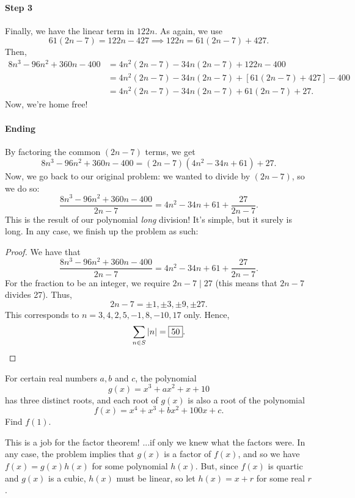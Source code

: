 \documentclass[../jarvis.tex]{subfiles}
\begin{document}
\paragraph{Step 3}Finally, we have the linear term in $122n$.
As again, we use $$61(2n-7)=122n-427 \implies 122n=61(2n-7)+427.$$ Then, 
\begin{align*}
    8n^3-96n^2+360n-400 &= 4n^2(2n-7)-34n(2n-7)+122n-400 \\
    &= 4n^2(2n-7)-34n(2n-7)+\left[61(2n-7)+427\right]-400 \\
    &= 4n^2(2n-7)-34n(2n-7)+61(2n-7)+27.
\end{align*}
Now, we're home free!
\paragraph{Ending}
By factoring the common $(2n-7)$ terms, we get
$$8n^3-96n^2+360n-400=(2n-7)(4n^2-34n+61)+27.$$ Now, we go back to our original problem: we wanted to divide by $(2n-7)$, so we do so:
$$\frac{8n^3-96n^2+360n-400}{2n-7}=4n^2-34n+61+\frac{27}{2n-7}.$$
This is the result of our polynomial \textit{long} division! It's simple, but it surely is long. In any case, we finish up the problem as such:

\begin{proof}
    We have that $$\frac{8n^3-96n^2+360n-400}{2n-7}=4n^2-34n+61+\frac{27}{2n-7}.$$
    For the fraction to be an integer, we require $2n-7\mid 27$ (this means that $2n-7$ divides 27). Thus,
    $$2n-7=\pm 1,\pm 3, \pm 9,\pm 27.$$
    This corresponds to $n=3,4,2,5,-1,8,-10,17$ only. Hence,
    $$\sum_{n\in S}\left\lvert n \right\rvert=\boxed{50}.$$
\end{proof}

\begin{example}[2017 AMC12A P23]
    For certain real numbers $a,b$ and $c$, the polynomial
    $$g(x)=x^3+ax^2+x+10$$ has three distinct roots, and each root of $g(x)$ is also a root of the polynomial
    $$f(x)=x^4+x^3+bx^2+100x+c.$$
    Find $f(1)$.
\end{example}
This is a job for the factor theorem! ...if only we knew what the factors were. In any case, the problem implies that $g(x)$ is a factor of $f(x)$, and so we have
$f(x)=g(x)h(x)$ for some polynomial $h(x)$. But, since $f(x)$ is quartic and $g(x)$ is a cubic, $h(x)$ must be linear, so let $h(x)=x+r$ for some real $r$.
\end{document}
